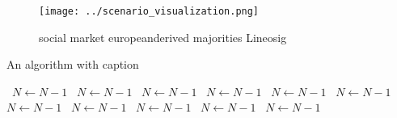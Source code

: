 \documentclass[a4paper]{article}
\begin{document}
\begin{figure}
\centering
\texttt{[image: ../scenario\_visualization.png]}
\caption{social market europeanderived majorities Lineosig
}
\end{figure}
 
\begin{algorithm}
\caption{An algorithm with caption}
\begin{algorithmic}
\    \State $N \gets N - 1$
\    \State $N \gets N - 1$
\    \State $N \gets N - 1$
\    \State $N \gets N - 1$
\    \State $N \gets N - 1$
\    \State $N \gets N - 1$
\    \State $N \gets N - 1$
\    \State $N \gets N - 1$
\    \State $N \gets N - 1$
\    \State $N \gets N - 1$
\    \State $N \gets N - 1$
\EndWhile
\end{algorithmic}
\end{algorithm}
\end{document}
